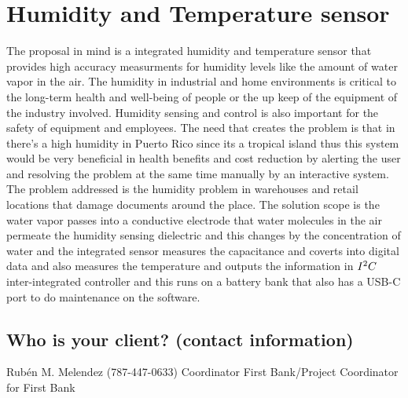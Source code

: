 \chapter {Humidity and Temperature sensor}

The proposal in mind is a integrated humidity and temperature sensor that provides high accuracy measurments for humidity levels like the amount of water vapor in the air. The humidity in industrial and home environments is critical to the long-term health and well-being of people or the up keep of the equipment of the industry involved. Humidity sensing and control is also important for the safety of equipment and employees. The need that creates the problem is that in there's a high humidity in Puerto Rico since its a tropical island thus this system would be very beneficial in health benefits and cost reduction by alerting the user and resolving the problem at the same time manually by an interactive system. The problem addressed is the humidity problem in warehouses and retail locations that damage documents around the place. The solution scope is the water vapor passes into a conductive electrode that water molecules in the air permeate the humidity sensing dielectric and this changes by the concentration of water and the integrated sensor measures the capacitance and coverts into digital data and also measures the temperature and outputs the information in $\normalfont{I^{2}C}$ inter-integrated controller and this runs on a battery bank that also has a USB-C port to do maintenance on the software.

\newpage
\section {Who is your client? (contact information)}
Rubén M. Melendez (787-447-0633)
Coordinator First Bank/Project Coordinator for First Bank
